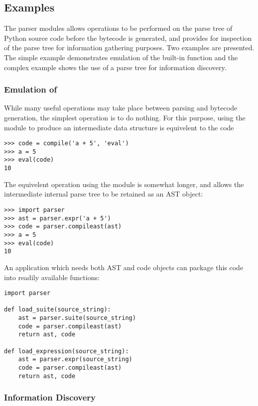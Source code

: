 \subsection{Examples}

The parser modules allows operations to be performed on the parse tree
of Python source code before the bytecode is generated, and provides
for inspection of the parse tree for information gathering purposes.
Two examples are presented.  The simple example demonstrates emulation
of the  built-in function and
the complex example shows the use of a parse tree for information
discovery.

\subsubsection{Emulation of }

While many useful operations may take place between parsing and
bytecode generation, the simplest operation is to do nothing.  For
this purpose, using the  module to produce an
intermediate data structure is equivelent to the code

\begin{verbatim}
>>> code = compile('a + 5', 'eval')
>>> a = 5
>>> eval(code)
10
\end{verbatim}
%
The equivelent operation using the  module is somewhat
longer, and allows the intermediate internal parse tree to be retained
as an AST object:

\begin{verbatim}
>>> import parser
>>> ast = parser.expr('a + 5')
>>> code = parser.compileast(ast)
>>> a = 5
>>> eval(code)
10
\end{verbatim}
%
An application which needs both AST and code objects can package this
code into readily available functions:

\begin{verbatim}
import parser

def load_suite(source_string):
    ast = parser.suite(source_string)
    code = parser.compileast(ast)
    return ast, code

def load_expression(source_string):
    ast = parser.expr(source_string)
    code = parser.compileast(ast)
    return ast, code
\end{verbatim}
%
\subsubsection{Information Discovery}

